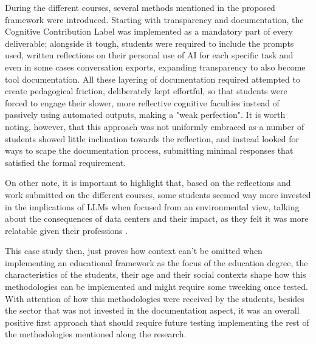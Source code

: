 \documentclass{article}
\begin{document}
During the different courses, several methods mentioned in the proposed framework were introduced. Starting with transparency and documentation, the Cognitive Contribution Label \cite{fuentemilla2024ccl} was implemented  as a mandatory part of every deliverable; alongside it tough, students were required to include the prompts used, written reflections on their personal use of AI for each specific task and even in some cases conversation exports, expanding transparency to also become tool documentation. All these layering of documentation required attempted to create pedagogical friction, deliberately kept effortful, so that students were forced to engage their slower, more reflective cognitive faculties instead of passively using automated outputs, making a "weak perfection"\cite{ward2025}. It is worth noting, however, that this approach was not uniformly embraced as a number of students showed little inclination towards the reflection, and instead looked for ways to scape the documentation process, submitting minimal responses that satisfied the formal requirement.

On other note, it is important to highlight that, based on the reflections and work submitted on the different courses, some students seemed way more invested in the implications of LLMs when focused from an environmental view, talking about the consequences of data centers and their impact, as they felt it was more relatable given their professions \cite{andy_alex_2025}.

This case study then, just proves how context can't be omitted when implementing an educational framework as the focus of the education degree, the characteristics of the students, their age and their social contexts shape how this methodologies can be implemented and might require some tweeking once tested. With attention of how this methodologies were received by the students, besides the sector that was not invested in the documentation aspect, it was an overall positive first approach that should require future testing implementing the rest of the methodologies mentioned along the research.
\end{document}
